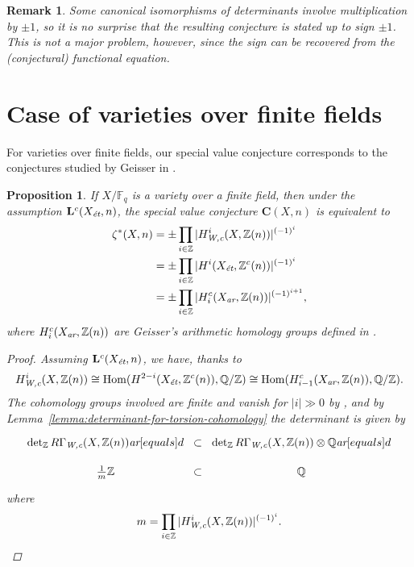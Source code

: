 \documentclass[10pt,a4paper,oneside,draft]{article}
\DeclareMathOperator{\Hom}{Hom}
\newcommand{\FF}{\mathbb{F}}
\newcommand{\QQ}{\mathbb{Q}}
\newcommand{\ZZ}{\mathbb{Z}}
\renewcommand{\det}{\operatorname{det}}
\newcommand{\ar}{\text{\it ar}}
\newcommand{\et}{\text{\it \'{e}t}}
\newcommand{\Wc}{\text{\it W,c}}
\theoremstyle{myplain}
\newtheorem{proposition}[theorem]{Proposition}
\theoremstyle{mydefinition}
\newtheorem{remark}[theorem]{Remark}
\numberwithin{equation}{section}
\begin{document}
\begin{remark}
  Some canonical isomorphisms of determinants involve multiplication by $\pm 1$,
  so it is no surprise that the resulting conjecture is stated up to sign
  $\pm 1$. This is not a major problem, however, since the sign can be recovered
  from the (conjectural) functional equation.
\end{remark}


\section{Case of varieties over finite fields}
\label{sec:finite-fields}

For varieties over finite fields, our special value conjecture corresponds to
the conjectures studied by Geisser in
\cite{Geisser-2004,Geisser-2006,Geisser-2010-arithmetic-homology}.

\begin{proposition}
  \label{prop:C(X,n)-over-finite-fields}
  If $X/\FF_q$ is a variety over a finite field, then under the assumption
  $\mathbf{L}^c (X_\et,n)$, the special value conjecture $\mathbf{C} (X,n)$ is
  equivalent to
  \begin{align}
    \label{eqn:special-value-for-X/Fq}
    \notag \zeta^* (X,n) & = \pm \prod_{i \in \ZZ} |H_\Wc^i (X, \ZZ(n))|^{(-1)^i} \\
                         & = \pm \prod_{i \in \ZZ} |H^i (X_\et, \ZZ^c (n))|^{(-1)^i} \\
    \notag & = \pm \prod_{i \in \ZZ} |H_i^c (X_\ar, \ZZ (n))|^{(-1)^{i+1}},
  \end{align}
  where $H_i^c (X_\ar, \ZZ (n))$ are Geisser's arithmetic homology groups
  defined in \cite{Geisser-2010-arithmetic-homology}.

  \begin{proof}
    Assuming $\mathbf{L}^c (X_\et,n)$, we have, thanks to
    \cite[Proposition~7.7]{Beshenov-Weil-etale-1}
    \[ H^i_\Wc (X, \ZZ (n)) \cong
      \Hom (H^{2-i} (X_\et, \ZZ^c (n)), \QQ/\ZZ) \cong
      \Hom (H_{i-1}^c (X_\ar, \ZZ (n)), \QQ/\ZZ). \]
    The cohomology groups involved are finite and vanish for $|i| \gg 0$ by
    \cite[Proposition~4.2]{Beshenov-Weil-etale-1}, and by
    Lemma~\ref{lemma:determinant-for-torsion-cohomology} the determinant is given by
    \[ \begin{tikzcd}[row sep=0.75em, column sep=0pt]
        \det_\ZZ R\Gamma_\Wc (X, \ZZ (n)) \ar[equals]{d} & \subset & \det_\ZZ R\Gamma_\Wc (X, \ZZ (n)) \otimes \QQ \ar[equals]{d} \\
        \frac{1}{m}\ZZ & \subset & \QQ
      \end{tikzcd} \]
    where
    \[ m = \prod_{i \in \ZZ} |H_\Wc^i (X, \ZZ(n))|^{(-1)^i}. \qedhere \]
  \end{proof}
\end{proposition}
\end{document}
